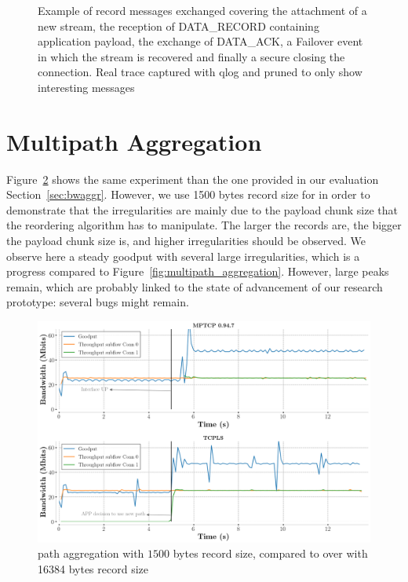 \begin{figure}[!t]
\begin{center}
\begin{tiny}
\begin{tikzpicture}[every node/.style={font=\tiny, minimum height=0.03cm,minimum width=0.03cm},scale=0.90, transform shape]
\end{tikzpicture}
\end{tiny}
\end{center}
  \caption{Example of record messages exchanged covering the attachment of a
    new stream, the reception of DATA\_RECORD containing application payload, the exchange of DATA\_ACK, a Failover
    event in which the stream is recovered and finally a secure closing the
    connection. Real trace captured with qlog and pruned to only show
    interesting messages}
  \label{fig:protocol_example}
\end{figure}

\section{Multipath Aggregation}
\label{appendix:aggr}

Figure~\ref{fig:aggregation_1500bytes_records} shows the same experiment than
the one provided in our evaluation Section~\ref{sec:bwaggr}. However, we use
1500 bytes record size for \tcpls in order to demonstrate that the
irregularities are mainly due to the payload chunk size that the reordering
algorithm has to manipulate. The larger the records are, the bigger
the payload chunk size is, and higher irregularities should be observed. We
observe here a steady goodput with several large irregularities, which is a
progress compared to Figure~\ref{fig:multipath_aggregation}. However, large
peaks remain, which are probably linked to the state of advancement of our
research prototype: several bugs might remain.

\begin{figure}
  \includegraphics[width=\columnwidth]{figures/aggregate_1500bytes_records_dual.png}
  \caption{\tcpls path aggregation with $1500$ bytes record size, compared to
    \tls over \mptcp with 16384 bytes record size}
  \label{fig:aggregation_1500bytes_records}
\end{figure}
